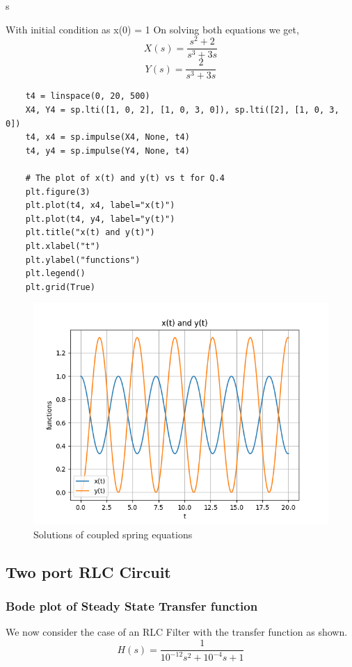 s\documentclass{article}
\begin{document}
With initial condition as x(0) = 1
On solving both equations we get,
\begin{equation}
   X(s) = \frac{s^2+2}{s^3+3s} 
\end{equation}
\begin{equation}
  Y(s) =  \frac{2}{s^3+3s}  
\end{equation}
 \begin{verbatim}
    t4 = linspace(0, 20, 500)
    X4, Y4 = sp.lti([1, 0, 2], [1, 0, 3, 0]), sp.lti([2], [1, 0, 3, 0])
    t4, x4 = sp.impulse(X4, None, t4)
    t4, y4 = sp.impulse(Y4, None, t4)
    
    # The plot of x(t) and y(t) vs t for Q.4
    plt.figure(3)
    plt.plot(t4, x4, label="x(t)")
    plt.plot(t4, y4, label="y(t)")
    plt.title("x(t) and y(t)")
    plt.xlabel("t")
    plt.ylabel("functions")
    plt.legend()
    plt.grid(True)
 \end{verbatim}
 
 \begin{figure}[!ht]
  \centering
  \includegraphics[scale=1]{Figure_3.png}
  \caption{Solutions of coupled spring equations}
  \label{fig:sample}
  \end{figure}

\subsection{Two port RLC Circuit}
\subsubsection{Bode plot of Steady State Transfer function}
We now consider the case of an RLC Filter with the transfer function as shown.
\begin{equation}
    H(s) = \frac{1}{10^{-12}s^2 + 10^{-4}s + 1}
\end{equation}
 
\end{document}
